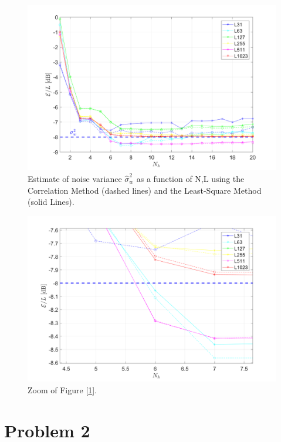 \documentclass[a4paper, 12pt]{report}
\begin{document}
\begin{figure}[H]
	\centering
	\includegraphics[width=18cm]{images/Ex1_plot1}
	\caption{Estimate of noise variance $\hat{\sigma}_w^2$ as a function of N,L using the Correlation Method (dashed lines) and the Least-Square Method (solid Lines).}\label{Ex1_plot1}
\end{figure}

\begin{figure}[H]
	\centering
	\includegraphics[width=14cm]{images/Ex1_plot2}
	\caption{Zoom of Figure [\ref{Ex1_plot1}].}\label{Ex1_plot2}
\end{figure}


 
\clearpage
\section*{Problem 2}
\end{document}
